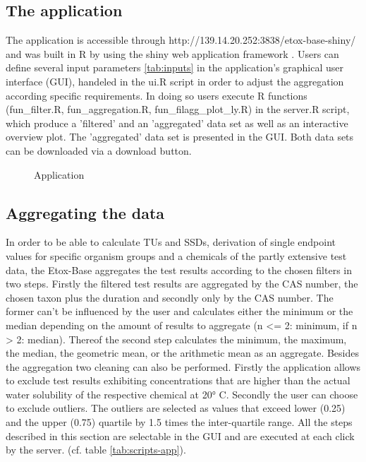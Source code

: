 \documentclass[english]{article}
\newcommand{\etoxbase}{Etox-Base}
\newcommand{\app}{http://139.14.20.252:3838/etox-base-shiny/}
\begin{document}
\subsection*{The application}
The application is accessible through \app{} and was built in R by using the shiny web application framework \citep{chang_shiny_2018}. Users can define several input parameters \ref{tab:inputs} in the application's graphical user interface (GUI), handeled in the ui.R script in order to adjust the aggregation according specific requirements. In doing so users execute R functions (fun\_filter.R, fun\_aggregation.R, fun\_filagg\_plot\_ly.R) in the server.R script, which produce a 'filtered' and an 'aggregated' data set as well as an interactive overview plot. The 'aggregated' data set is presented in the GUI. Both data sets can be downloaded via a download button.

\begin{figure}
    
    \caption{Application}
    \label{fig:app}
\end{figure}

\subsection*{Aggregating the data}
In order to be able to calculate TUs and SSDs, derivation of single endpoint values for specific organism groups and a chemicals of the partly extensive test data, the \etoxbase{} aggregates the test results according to the chosen filters in two steps. Firstly the filtered test results are aggregated by the CAS number, the chosen taxon plus the duration and secondly only by the CAS number. The former can't be influenced by the user and calculates either the minimum or the median depending on the amount of results to aggregate (n <= 2: minimum, if n > 2: median). Thereof the second step calculates the minimum, the maximum, the median, the geometric mean, or the arithmetic mean as an aggregate. Besides the aggregation two cleaning can also be performed. Firstly the application allows to exclude test results exhibiting concentrations that are higher than the actual water solubility of the respective chemical at \ang{20} C. Secondly the user can choose to exclude outliers. The outliers are selected as values that exceed lower (0.25) and the upper (0.75) quartile by 1.5 times the inter-quartile range. All the steps described in this section are selectable in the GUI and are executed at each click by the server. (cf. table \ref{tab:scripts-app}). 
\end{document}
